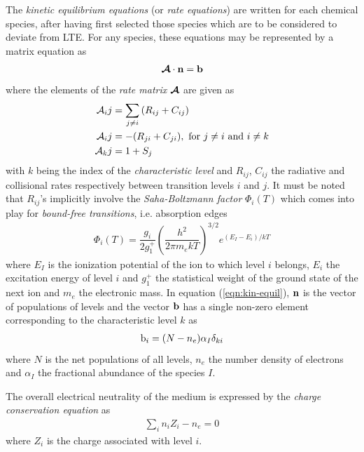 				The \textit{kinetic equilibrium equations} (or \textit{rate equations}) are written for each chemical species, after having first selected those species which are to be considered to deviate from LTE. For any species, these equations may be represented by a matrix equation as
				\begin{align}
					\boldsymbol{\mathcal{A}}\cdot\boldsymbol{\mathrm{n}}=\boldsymbol{\mathrm{b}} \label{eqn:kin-equil}
				\end{align}
				where the elements of the \textit{rate matrix} $\boldsymbol{\mathcal{A}}$ are given as
				\begin{align*}
					\mathcal{A}_{i}{j}&=\sum_{j\neq i}{(R_{ij}+C_{ij})} \\
					\mathcal{A}_{i}{j}&=-(R_{ji}+C_{ji}),\text{ for }j\neq i\text{ and }i\neq k \\
					\mathcal{A}_{k}{j}&=1+S_j
				\end{align*}
				with $k$ being the index of the \textit{characteristic level} and $R_{ij}$, $C_{ij}$ the radiative and collisional rates respectively between transition levels $i$ and $j$. It must be noted that $R_{ij}$'s implicitly involve the \textit{Saha-Boltzmann factor} $\Phi_i(T)$ which comes into play for \textit{bound-free transitions}, i.e. absorption edges
				\begin{align}
					\Phi_i(T)=\dfrac{g_i}{2g_1^+}\left( \dfrac{h^2}{2\pi m_e kT} \right)^{3/2}e^{(E_I-E_i)/kT} \label{eqn:saha-boltz-factor}
				\end{align}
				where $E_I$ is the ionization potential of the ion to which level $i$ belongs, $E_i$ the excitation energy of level $i$ and $g_1^+$ the statistical weight of the ground state of the next ion and $m_e$ the electronic mass. In equation (\ref{eqn:kin-equil}), $\boldsymbol{\mathrm{n}}$ is the vector of populations of levels and the vector $\boldsymbol{\mathrm{b}}$ has a single non-zero element corresponding to the characteristic level $k$ as
				\begin{align*}
					\mathrm{b}_{i}=(N-n_e)\alpha_I\delta_{ki}
				\end{align*}
				where $N$ is the net populations of all levels, $n_e$ the number density of electrons and $\alpha_I$ the fractional abundance of the species $I$.
				
				The overall electrical neutrality of the medium is expressed by the \textit{charge conservation equation} as
				\begin{align}
					\sum_i{n_iZ_i}-n_e=0 \label{eqn:ch-cons}
				\end{align}
				where $Z_i$ is the charge associated with level $i$.
				
